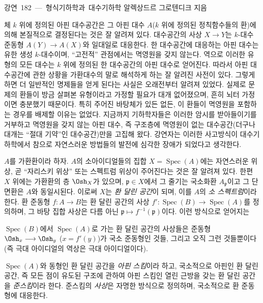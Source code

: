\unit{강연 182 — 형식기하학과 대수기하학}
%
  {알렉상드르 그로텐디크 지음}


체 $k$ 위에 정의된 아핀 대수공간은 그 아핀 대수 $A$($k$ 위에 정의된
정칙함수들의 환)에 의해 본질적으로 결정된다는 것은 잘 알려져 있다.
대수공간의 사상 $X\longrightarrow Y$는 $k$-대수 준동형
$A(Y)\longrightarrow A(X)$와 일대일로 대응한다. 한 대수공간에 대응하는
아핀 대수는 유한 생성 $k$-대수이며, ``고전적'' 관점에서는 멱영원을 갖지
않는다. 역으로 이러한 유형의 모든 대수는 $k$ 위에 정의된 한 대수공간의
아핀 대수로 얻어진다. 따라서 아핀 대수공간에 관한 상황을 가환대수의
말로 해석하게 하는 잘 알려진 사전이 있다. 그렇게 하면 더 일반적인
명제들을 얻게 된다는 사실은 오래전부터 알려져 있었다. 실제로 문제의
환들이 방금 살펴본 유형이라고 가정할 필요가 대개 없어졌으며, 흔히 뇌터
가정이면 충분했기 때문이다. 특히 주어진 바탕체가 있든 없든, 이 환들이
멱영원을 포함하는 경우를 배제할 이유는 없었다. 지금까지 기하학자들은
이러한 암시를 받아들이기를 거부하고 멱영원을 갖지 않는 아핀 대수, 즉
구조층에 멱영원이 없는 대수공간(더구나 대개는 ``절대 기약''인
대수공간)만을 고집해 왔다. 강연자는 이러한 사고방식이 대수기하학에서
참으로 자연스러운 방법들의 발전에 심각한 장애가 되었다고 생각한다.

$A$를 가환환이라 하자. $A$의 소아이디얼들의 집합
$X=\operatorname{Spec}(A)$에는 자연스러운 위상, 곧 ``자리스키 위상''
또는 스펙트럼 위상이 주어진다는 것은 잘 알려져 있다. 한편 $X$ 위에는
가환환의 층 $\Osh_X$가 있으며, $\mathfrak p\in X$에서 그 줄기는
국소화환 $A_{\mathfrak p}$이고 그 단면환은 $A$와 동일시된다. 이로써
$X$는 \emph{환 달린 공간}이 되며, 이를 $A$의 \emph{소 스펙트럼}이라
한다. 환 준동형 $f:A\longrightarrow B$는 환 달린 공간의 사상
$f':\operatorname{Spec}(B)\longrightarrow\operatorname{Spec}(A)$를
정의하며, 그 바탕 집합 사상은 다름 아닌
$\mathfrak p\longmapsto f^{-1}(\mathfrak p)$이다. 이런 방식으로 얻어지는

$\operatorname{Spec}(B)$에서 $\operatorname{Spec}(A)$로 가는 환 달린
공간의 사상들은 준동형 $\Osh_x\longrightarrow\Osh_y$ ($x=f'(y)$)가
국소 준동형인 것들, 그리고 오직 그런 것들뿐이다(즉 극대 아이디얼의
역상은 극대 아이디얼이다).

$\operatorname{Spec}(A)$와 동형인 환 달린 공간을 \emph{아핀 스킴}이라 하고,
국소적으로 아핀인 환 달린 공간, 즉 모든 점이 유도된 구조에 관하여 아핀
스킴인 열린 근방을 갖는 환 달린 공간을 \emph{준스킴}이라 한다. 준스킴의
\emph{사상}은 자명한 방식으로 정의하며, 국소적으로 환 준동형에 대응한다.


